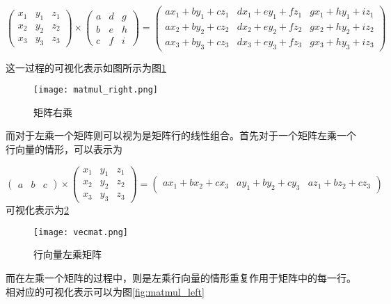 \begin{equation}
  \begin{pmatrix}
    x_1 & y_1 & z_1\\
    x_2 & y_2 & z_2\\  
    x_3 & y_3 & z_3
  \end{pmatrix}
  \times 
  \begin{pmatrix}
    a & d & g\\
    b & e & h\\
    c & f & i
  \end{pmatrix}
  = 
  \begin{pmatrix}
    ax_1 + by_1 + cz_1 & dx_1 + ey_1 + fz_1 & gx_1 + hy_1 + iz_1 \\
    ax_2 + by_2 + cz_2 & dx_2 + ey_2 + fz_2 & gx_2 + hy_2 + iz_2 \\
    ax_3 + by_3 + cz_3 & dx_3 + ey_3 + fz_3 & gx_3 + hy_3 + iz_3
  \end{pmatrix}
\end{equation}

这一过程的可视化表示如图所示为图\ref{fig:matmul_right}

\begin{figure}
\centering
\texttt{[image: matmul\_right.png]}
\caption{矩阵右乘}
\label{fig:matmul_right}
\end{figure}

而对于左乘一个矩阵则可以视为是矩阵行的线性组合。首先对于一个矩阵左乘一个行向量的情形，可以表示为

\begin{equation}
  \begin{pmatrix}
    a & b & c
  \end{pmatrix}
  \times
  \begin{pmatrix}
    x_1 & y_1 & z_1 \\
    x_2 & y_2 & z_2 \\
    x_3 & y_3 & z_3 
  \end{pmatrix}
  = 
  \begin{pmatrix}
    ax_1 + bx_2 + cx_3 & ay_1 + by_2 + cy_3 & az_1 + bz_2 + cz_3
  \end{pmatrix}
\end{equation}
可视化表示为\ref{fig:vecmat}

\begin{figure}
\centering
\texttt{[image: vecmat.png]}
\caption{行向量左乘矩阵}
\label{fig:vecmat}
\end{figure}

而在左乘一个矩阵的过程中，则是左乘行向量的情形重复作用于矩阵中的每一行。相对应的可视化表示可以为图\ref{fig:matmul_left}

